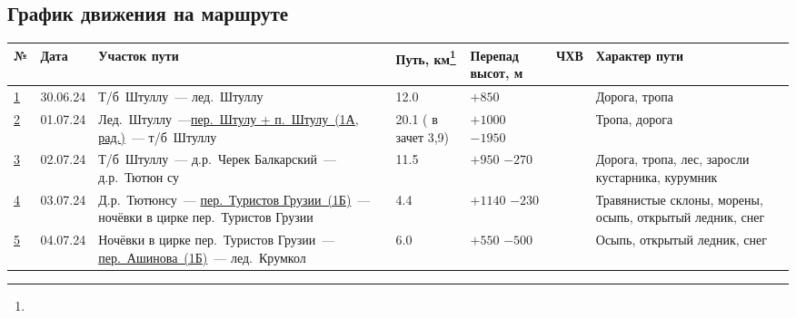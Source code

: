 	\subsection{График движения на маршруте}
		{\footnotesize
		\begin{longtable}{|A|B|C|B|B|D|E|} \hline
			№							&	Дата 		&	Участок пути																																																&	Путь, км\footnote{\textOne}	&	Перепад высот, м		&	ЧХВ		&	Характер пути																\\ \hline
			\hyperref[subsec:Day1]{1}	&	30.06.24	&	Т/б~Штуллу~--- лед.~Штуллу																																													&	12.0						&	$+850$ 			&			&	Дорога, тропа																\\ \hline
			\hyperref[subsec:Day2]{2}	&	01.07.24	&	Лед.~Штуллу~---\hyperref[subsec:main_obstacles]{пер.~Штулу + п.~Штулу~(1А, рад.)}~--- т/б~Штуллу																											&	20.1 ( в зачет 3,9)						&	$+1000$ $-1950$			&			&	Тропа, дорога																\\ \hline
			\hyperref[subsec:Day3]{3}	&	02.07.24	&	Т/б~Штуллу~--- д.р.~Черек Балкарский~--- д.р.~Тютюн	су																																						&	11.5						&	$+950$ $-270$			&			&	Дорога, тропа, лес, заросли кустарника, курумник							\\ \hline
			\hyperref[subsec:Day4]{4}	&	03.07.24	&	Д.р.~Тютюнсу~--- \hyperref[subsec:main_obstacles]{пер.~Туристов Грузии~(1Б)}~--- ночёвки в цирке пер.~Туристов Грузии																						&	4.4							&	$+1140$ $-230$ 			&			&	Травянистые склоны, морены, осыпь, открытый ледник, снег					\\ \hline
			\hyperref[subsec:Day5]{5}	&	04.07.24	&	Ночёвки в цирке пер.~Туристов Грузии~--- \hyperref[subsec:main_obstacles]{пер.~Ашинова~(1Б)}~--- лед.~Крумкол																								&	6.0							&	$+550$ $-500$ 			&			&	Осыпь, открытый ледник, снег												\\ \hline

\end{longtable}}
